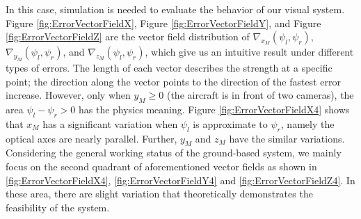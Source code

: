 \documentclass[journal,article,submit,moreauthors,pdftex,10pt,a4paper]{mdpi}
\begin{document}
In this case, simulation is needed to evaluate the behavior of our visual system. Figure  \ref{fig:ErrorVectorFieldX}, Figure  \ref{fig:ErrorVectorFieldY}, and Figure  \ref{fig:ErrorVectorFieldZ} are the vector field distribution of $\nabla_{x_M}(\psi_l, \psi_r)$, $\nabla_{y_M}(\psi_l, \psi_r)$, and $\nabla_{z_M}(\psi_l, \psi_r)$, which give us an intuitive result under different types of errors. The length of each vector describes the strength at a specific point; the direction along the vector points to the direction of the fastest error increase. However, only when $y_M \geq 0$ (the aircraft is in front of two cameras), the area $\psi_l - \psi_r > 0$ has the physics meaning. Figure  \ref{fig:ErrorVectorFieldX4} shows that $x_M$ has a significant variation when $\psi_l$ is approximate to $\psi_r$, namely the optical axes are nearly parallel. Further, $y_M$ and $z_M$ have the similar variations. Considering the general working status of the ground-based system, we mainly focus on the second  quadrant of aforementioned vector fields as shown in \ref{fig:ErrorVectorFieldX4}, \ref{fig:ErrorVectorFieldY4} and \ref{fig:ErrorVectorFieldZ4}. In these area, there are slight variation that theoretically demonstrates the feasibility of the system. 

 
\end{document}
